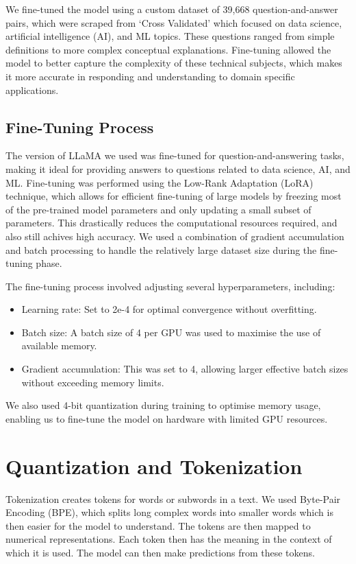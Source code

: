 \documentclass[10pt]{article}
\begin{document}
We fine-tuned the model using a custom dataset of 39,668 question-and-answer pairs, which were scraped
from `Cross Validated' which focused on data science, artificial intelligence (AI), and ML topics.
These questions ranged from simple definitions to more complex conceptual explanations. Fine-tuning allowed the
model to better capture the complexity of these technical subjects, which makes it more accurate in responding and
understanding to domain specific applications.

\subsection{Fine-Tuning Process}

The version of LLaMA we used was fine-tuned for question-and-answering tasks, making it ideal for providing answers
to questions related to data science, AI, and ML.
Fine-tuning was performed using the Low-Rank Adaptation (LoRA) technique, which allows for efficient fine-tuning
of large models by freezing most of the pre-trained model parameters and only updating a small subset of parameters.
This drastically reduces the computational resources required, and also still achives high accuracy. We used
a combination of gradient accumulation and batch processing to handle the relatively large dataset size during
the fine-tuning phase.

The fine-tuning process involved adjusting several hyperparameters, including:
\begin{itemize}
    \item Learning rate: Set to 2e-4 for optimal convergence without overfitting.
    \item Batch size: A batch size of 4 per GPU was used to maximise the use of available memory.
    \item Gradient accumulation: This was set to 4, allowing larger effective batch sizes without exceeding memory limits.
\end{itemize}
We also used 4-bit quantization during training to optimise memory usage, enabling us to fine-tune the model on hardware with limited GPU resources.

\section{Quantization and Tokenization}

Tokenization creates tokens for words or subwords in a text.
We used Byte-Pair Encoding (BPE), which splits long complex words into smaller
words which is then easier for the model to understand. The tokens are then mapped to numerical
representations. Each token then has the meaning in the context of which it is used. The model
can then make predictions from these tokens.
\end{document}
